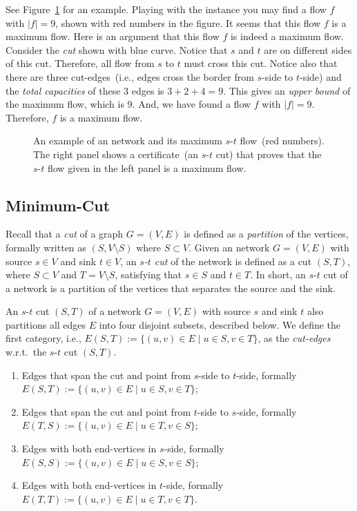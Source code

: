 See Figure~\ref{fig:maxflow} for an example. Playing with the instance you may find
a flow $f$ with $|f| = 9$, shown with red numbers in the figure.
It seems that this flow $f$ is a maximum flow.
Here is an argument that this flow $f$ is indeed a maximum flow.
Consider the \emph{cut} shown with blue curve. Notice that
$s$ and $t$ are on different sides of this cut. Therefore, all flow
from $s$ to $t$ must cross this cut. Notice also that there are three
cut-edges~(i.e., edges cross the border from $s$-side to $t$-side)
and the \emph{total capacities} of these 3 edges is $3 + 2 + 4 = 9$.
This gives an \emph{upper bound} of the maximum flow, which is 9.
And, we have found a flow $f$ with $|f| = 9$. Therefore, $f$
is a maximum flow.

\begin{figure}[h]
\centering{}
\caption{An example of an network and its maximum $s$-$t$ flow~(red numbers).
The right panel shows a certificate~(an $s$-$t$ cut) that proves that
the $s$-$t$ flow given in the left panel is a maximum flow.}
\label{fig:maxflow}
\end{figure}


\subsection*{Minimum-Cut}

Recall that a \emph{cut} of a graph $G = (V, E)$ is defined
as a \emph{partition} of the vertices, formally written as $(S, V\setminus S)$ where $S \subset V$.
Given an network $G=(V, E)$ with source $s\in V$ and sink $t\in V$, 
an \emph{$s$-$t$ cut} of the network is defined as a cut $(S, T)$, where $S\subset V$ and $T = V\setminus S$,
satisfying that $s\in S$ and $t\in T$. In short, an $s$-$t$ cut of a network is a partition
of the vertices that separates the source and the sink.

An $s$-$t$ cut $(S, T)$ of a network $G = (V, E)$ with source $s$ and sink $t$ also partitions all
edges $E$ into four disjoint subsets, described below. 
We define the first category, i.e., $E(S, T) := \{(u,v)\in E\mid u\in S, v\in T\}$,
as the \emph{cut-edges} w.r.t.\ the $s$-$t$ cut $(S, T)$.
\vspace*{-\topsep}
\begin{enumerate}
\item Edges that span the cut and point from $s$-side to $t$-side, formally $E(S, T) := \{(u,v)\in E\mid u\in S, v\in T\}$;
\item Edges that span the cut and point from $t$-side to $s$-side, formally $E(T, S) := \{(u,v)\in E\mid u\in T, v\in S\}$;
\item Edges with both end-vertices in $s$-side, formally $E(S, S) := \{(u,v)\in E\mid u\in S, v\in S\}$;
\item Edges with both end-vertices in $t$-side, formally $E(T, T) := \{(u,v)\in E\mid u\in T, v\in T\}$.
\end{enumerate}

